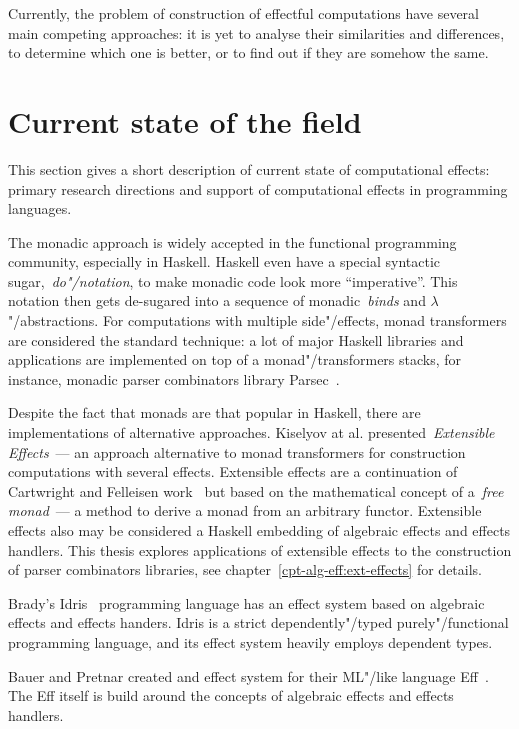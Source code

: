 Currently, the problem of construction of effectful computations have several
main competing approaches: it is yet to analyse their similarities and differences,
to determine which one is better, or to find out if they are somehow the same.

\section{Current state of the field}

This section gives a short description of current state of computational effects:
primary research directions and support of computational effects in programming
languages.

The monadic approach is widely accepted in the functional programming community,
especially in Haskell. Haskell even have a special syntactic sugar,~\emph{do"/notation}, to
make monadic code look more ``imperative''. This notation then gets de-sugared
into a sequence of monadic~\emph{binds} and $\lambda$"/abstractions. For computations
with multiple side"/effects, monad transformers are considered the standard technique:
a lot of major Haskell libraries and applications are implemented on top of a
monad"/transformers stacks, for instance, monadic parser combinators library
Parsec~\cite{parsec}.

Despite the fact that monads are that popular in Haskell, there are implementations
of alternative approaches. Kiselyov at al. presented~\emph{Extensible Effects}~---
an approach alternative to monad transformers for construction computations with
several effects. Extensible effects are a continuation of Cartwright and Felleisen
work~\cite{Cartwright1994} but based on the mathematical concept of a~\emph{free monad}~--- a
method to derive a monad from an arbitrary functor. Extensible effects also may be
considered a Haskell embedding of algebraic effects and effects handlers. This thesis
explores applications of extensible effects to the construction of parser combinators
libraries, see chapter~\ref{cpt-alg-eff:ext-effects} for details.

Brady's Idris~\cite{DBLP:conf/lfmtp/Brady14} programming language has an effect
system based on algebraic effects and effects handers. Idris is a strict
dependently"/typed purely"/functional programming language, and its effect system
heavily employs dependent types.

Bauer and Pretnar created and effect system for their ML"/like language
Eff~\cite{DBLP:journals/corr/BauerP13}. The Eff itself is build around the concepts
of algebraic effects and effects handlers.

